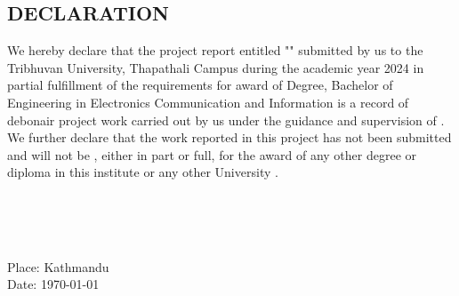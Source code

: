 \begin{titlepage}

	\chapter*{DECLARATION}
	\thispagestyle{empty}

	\noindent We hereby declare that the project report entitled "{\textbf{\cTitle}}" submitted by us to the Tribhuvan University, Thapathali Campus during the academic year 2024 in partial fulfillment of the requirements for  award of Degree, Bachelor of Engineering in Electronics Communication and Information  is a record of debonair project work carried out by us under the guidance and supervision of {\textbf\cSupervisor}. We further declare that the work reported in this project has not been submitted and will not be , either in part or  full, for the award of any other degree or diploma in this institute or any other University .

	\vspace{2cm}

	\begin{flushright}
		\textbf{\MakeUppercase{\cSubmittedI}} \\		\textbf{\MakeUppercase{\cSubmittedII}} \\		\textbf{\MakeUppercase{\cSubmittedIII}} \\
	\end{flushright}

	\noindent Place: Kathmandu \\
	Date: \today

\end{titlepage}
